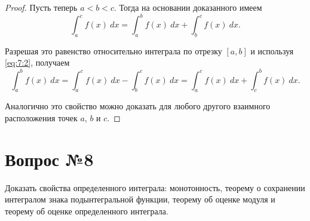 \documentclass[12pt]{report}
\numberwithin{equation}{section}
\begin{document}
\begin{proof}
Пусть теперь $a < b < c$. Тогда на основании доказанного имеем
\[ \int_a^c f(x)~dx = \int_a^b f(x)~dx + \int_b^c f(x)~dx.\]

Разрешая это равенство относительно интеграла по отрезку $[a,b]$ и используя \eqref{eq:7:2}, получаем
\[ \int_a^b f(x)~dx = \int_a^c f(x)~dx - \int_b^c f(x)~dx = \int_a^c f(x)~dx + \int_c^b f(x)~dx.\]

Аналогично это свойство можно доказать для любого другого взаимного расположения точек $a$, $b$ и $c$.
\end{proof}

\newpage \section{Вопрос №8} %
\begin{framed}
Доказать свойства определенного интеграла: монотонность, теорему о сохранении интегралом знака подынтегральной функции, теорему об оценке модуля и теорему об оценке определенного интеграла.
\end{framed}
\end{document}
